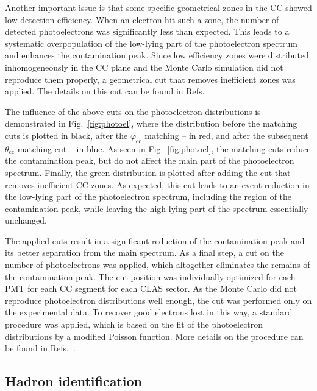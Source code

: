 \documentclass[prc,twocolumn,superscriptaddress,showpacs,amssymb,amsmath,amsfonts,aps,nofootinbib]{revtex4-1}
\begin{document}
Another important issue is that some specific geometrical zones in the CC showed low detection efficiency. When an electron hit such a zone, the number of detected photoelectrons was significantly less than expected. This leads to a systematic overpopulation of the low-lying part of the photoelectron spectrum and enhances the contamination peak. Since low efficiency zones were distributed inhomogeneously in the CC plane and the Monte Carlo simulation did not reproduce them properly, a geometrical cut that removes inefficient zones was applied. The details on this cut can be found in Refs.\!~\cite{my_an_note:2020, my_thesis:2021,Fed_an_note:2017,Fed_paper_2018}.




The influence of the above cuts on the photoelectron distributions is demonstrated in Fig.\!~\ref{fig:photoel}, where the distribution before the matching cuts is plotted in black, after the $\varphi_{\text{cc}}$ matching -- in red, and after the subsequent $\theta_{\text{cc}}$ matching cut -- in blue. As seen in Fig.\!~\ref{fig:photoel}, the matching cuts reduce the contamination peak, but do not affect the main part of the photoelectron spectrum. Finally, the green distribution is plotted after adding the cut that removes inefficient CC zones. As expected, this cut leads to an event reduction in the low-lying part of the photoelectron spectrum, including the region of the contamination peak, while leaving the high-lying part of the spectrum essentially unchanged.


The applied cuts result in a significant reduction of the contamination peak and its better separation from the main spectrum. As a final step, a cut on the number of photoelectrons was applied, which altogether eliminates the remains of the contamination peak. The cut position was individually optimized for each PMT for each CC segment for each CLAS sector. As the Monte Carlo did not reproduce photoelectron distributions well enough, the cut was performed only on the experimental data. To recover good electrons lost in this way, a standard procedure was applied, which is based on the fit of the photoelectron distributions by a modified Poisson function. More details on the procedure can be found in Refs.\!~\cite{my_an_note:2020, my_thesis:2021,Fed_an_note:2017,Fed_paper_2018}.




\subsection{Hadron identification}
\end{document}
